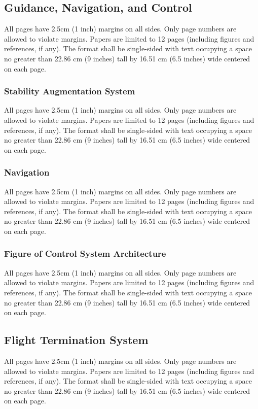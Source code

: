 \documentclass[12pt, letterpaper]{article}
\begin{document}
\subsection{Guidance, Navigation, and Control}
All pages have 2.5cm (1 inch) margins on all sides. Only page numbers are allowed to violate margins. Papers are limited to 12 pages (including figures and references, if any). The format shall be single-sided with text occupying a space no greater than 22.86 cm (9 inches) tall by 16.51 cm (6.5 inches) wide centered on each page.

\subsubsection{Stability Augmentation System}
All pages have 2.5cm (1 inch) margins on all sides. Only page numbers are allowed to violate margins. Papers are limited to 12 pages (including figures and references, if any). The format shall be single-sided with text occupying a space no greater than 22.86 cm (9 inches) tall by 16.51 cm (6.5 inches) wide centered on each page.

\subsubsection{Navigation}
All pages have 2.5cm (1 inch) margins on all sides. Only page numbers are allowed to violate margins. Papers are limited to 12 pages (including figures and references, if any). The format shall be single-sided with text occupying a space no greater than 22.86 cm (9 inches) tall by 16.51 cm (6.5 inches) wide centered on each page.

\subsubsection{Figure of Control System Architecture}
All pages have 2.5cm (1 inch) margins on all sides. Only page numbers are allowed to violate margins. Papers are limited to 12 pages (including figures and references, if any). The format shall be single-sided with text occupying a space no greater than 22.86 cm (9 inches) tall by 16.51 cm (6.5 inches) wide centered on each page.

\subsection{Flight Termination System}
All pages have 2.5cm (1 inch) margins on all sides. Only page numbers are allowed to violate margins. Papers are limited to 12 pages (including figures and references, if any). The format shall be single-sided with text occupying a space no greater than 22.86 cm (9 inches) tall by 16.51 cm (6.5 inches) wide centered on each page.
\end{document}
